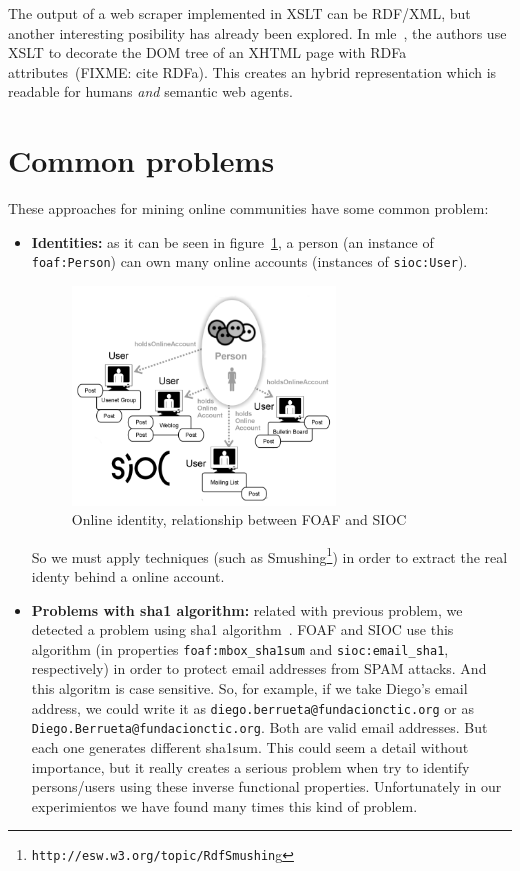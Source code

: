 \documentclass{../templates/www2008-submission}
\begin{document}
The output of a web scraper implemented in XSLT can be RDF/XML, but
another interesting posibility has already been explored. In
mle~\cite{Hausenblas2007}, the authors use XSLT to decorate the
DOM tree of an XHTML page with RDFa attributes~(FIXME: cite RDFa).
This creates an hybrid representation which is readable for
humans \emph{and} semantic web agents.


\section{Common problems}

These approaches for mining online communities have some common problem:

\begin{itemize}
  \item \textbf{Identities:} as it can be seen in figure~\ref{fig:foaf-sioc},
	a person (an instance of \texttt{foaf:Person}) can own many online 
	accounts (instances of \texttt{sioc:User}). 

	\begin{figure}[ht]
	 \centering
	 \includegraphics[width=7cm]{images/foaf-sioc.png}
	 \caption{\label{fig:foaf-sioc}Online identity, relationship between FOAF and SIOC}
	\end{figure}

	So we must apply techniques (such as 
	Smushing\footnote{\texttt{http://esw.w3.org/topic/RdfSmushin}g})
	in order to extract the real identy behind a online account.

  \item \textbf{Problems with sha1 algorithm:} related with previous problem,
	we detected a problem using sha1 algorithm~\cite{Eastlake2001}. FOAF 
	and SIOC use this algorithm (in properties \texttt{foaf:mbox\_sha1sum} 
	and \texttt{sioc:email\_sha1}, respectively) in order to protect email 
	addresses from SPAM attacks. And this algoritm is case sensitive. So,
	for example, if we take Diego's email address, we could write it as
	\texttt{diego.berrueta@fundacionctic.org} or as \texttt{Diego.Berrueta@fundacionctic.org}.
	Both are valid email addresses. But each one generates different sha1sum.
	This could  seem a detail without importance, but it really creates a 
	serious problem when try to identify persons/users using these
	inverse functional properties. Unfortunately in our experimientos we 
	have found many times this kind of problem.


\end{itemize}
\end{document}
